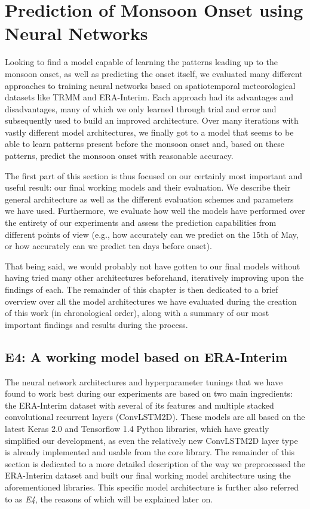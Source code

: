 \section{Prediction of Monsoon Onset using Neural Networks}
\label{st:nn_implementation}
Looking to find a model capable of learning the patterns leading up to the monsoon onset, as well as predicting the onset itself, we evaluated many different approaches to training neural networks based on spatiotemporal meteorological datasets like TRMM and ERA-Interim. Each approach had its advantages and disadvantages, many of which we only learned through trial and error and subsequently used to build an improved architecture. Over many iterations with vastly different model architectures, we finally got to a model that seems to be able to learn patterns present before the monsoon onset and, based on these patterns, predict the monsoon onset with reasonable accuracy.

The first part of this section is thus focused on our certainly most important and useful result: our final working models and their evaluation. We describe their general architecture as well as the different evaluation schemes and parameters we have used. Furthermore, we evaluate how well the models have performed over the entirety of our experiments and assess the prediction capabilities from different points of view (e.g., how accurately can we predict on the 15th of May, or how accurately can we predict ten days before onset).

That being said, we would probably not have gotten to our final models without having tried many other architectures beforehand, iteratively improving upon the findings of each. The remainder of this chapter is then dedicated to a brief overview over all the model architectures we have evaluated during the creation of this work (in chronological order), along with a summary of our most important findings and results during the process.

\subsection{E4: A working model based on ERA-Interim}
\label{sst:final_model}
The neural network architectures and hyperparameter tunings that we have found to work best during our experiments are based on two main ingredients: the ERA-Interim dataset with several of its features and multiple stacked convolutional recurrent layers (ConvLSTM2D). These models are all based on the latest Keras 2.0 and Tensorflow 1.4 Python libraries, which have greatly simplified our development, as even the relatively new ConvLSTM2D layer type is already implemented and usable from the core library. The remainder of this section is dedicated to a more detailed description of the way we preprocessed the ERA-Interim dataset and built our final working model architecture using the aforementioned libraries. This specific model architecture is further also referred to as \textit{E4}, the reasons of which will be explained later on.

